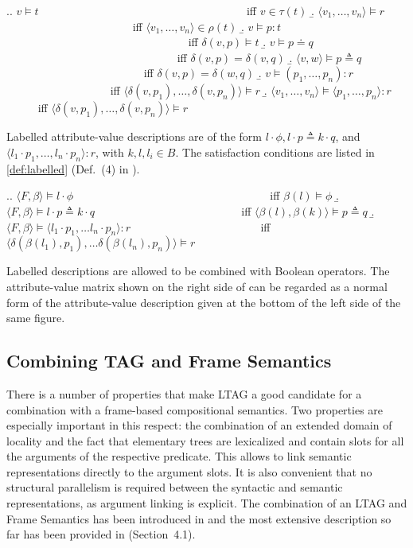 \ex.\label{def:satisfaction}\a. $v \models t$ ~~~~~~~~~~~~~~~~~~~~~~~~~~~~~~~~~~~~ iff $v \in \tau (t)$
\b. $\langle v_1, \ldots , v_n \rangle \models r$ ~~~~~~~~~~~~~~~~~~~~~~ iff $\langle v_1, \ldots , v_n \rangle \in \rho (t)$
\b. $v \models p : t$ ~~~~~~~~~~~~~~~~~~~~~~~~~~~~~~~~ iff $\delta (v, p) \models t$
\b. $v \models p \doteq q$ ~~~~~~~~~~~~~~~~~~~~~~~~~~~~~~ iff $\delta (v, p) = \delta (v, q)$
\b. $\langle v, w \rangle \models p \triangleq q$ ~~~~~~~~~~~~~~~~~~~~~~~~ iff $\delta (v, p) = \delta (w, q)$
\b. $v \models (p_1, \ldots , p_n ) : r$ ~~~~~~~~~~~~~~~~~~ iff $\langle \delta (v, p_1), \ldots , \delta (v, p_n) \rangle \models r$
\b. $\langle v_1, \ldots , v_n \rangle \models \langle p_1, \ldots , p_n \rangle : r$ ~~~~~ iff $\langle \delta (v, p_1), \ldots , \delta (v, p_n) \rangle \models r$

Labelled attribute-value descriptions are of the form $l \cdot \phi, l \cdot p \triangleq k \cdot q$, and $\langle l_1 \cdot p_1, \ldots , l_n \cdot p_n \rangle : r$, with $k, l, l_i \in B$. The satisfaction conditions are listed in \ref{def:labelled} (Def.~(4) in \citealt{KallmeyerOsswald:13}).

\ex.\label{def:labelled}\a. $\langle F, \beta \rangle \models l \cdot \phi$ ~~~~~~~~~~~~~~~~~~~~~~~~~~~~~~~~~~ iff $\beta (l) \models \phi $
\b.$\langle F, \beta \rangle \models l \cdot p \triangleq k \cdot q $ ~~~~~~~~~~~~~~~~~~~~~~~~~ iff $\langle \beta (l), \beta (k) \rangle \models p \triangleq q$
\b.$\langle F, \beta \rangle \models \langle l_1 \cdot p_1, \ldots l_n \cdot p_n \rangle : r$ ~~~~~~~~~~~~~~~~~~~~~~ iff $\langle \delta (\beta (l_1), p_1), \ldots \delta (\beta (l_n), p_n) \rangle \models r $

Labelled descriptions are allowed to be combined with Boolean operators. The attribute-value matrix shown on the right side of  can be regarded as a normal form of the attribute-value description given at the bottom of the left side of the same figure. 

\subsection{Combining TAG and Frame Semantics}
There is a number of properties that make LTAG a good candidate for a combination with a frame-based compositional semantics. Two properties are especially important in this respect: the combination of an extended domain of locality and the fact that elementary trees are lexicalized and contain slots for all the arguments of the respective predicate. This allows to link semantic representations directly to the argument slots. It is also convenient that no structural parallelism is required between the syntactic and semantic representations, as argument linking is explicit. The combination of an LTAG and Frame Semantics has been introduced in \cite{KallmeyerOsswald:12} and the most extensive description so far has been provided in \citealt{KallmeyerOsswald:13} (Section~4.1).

